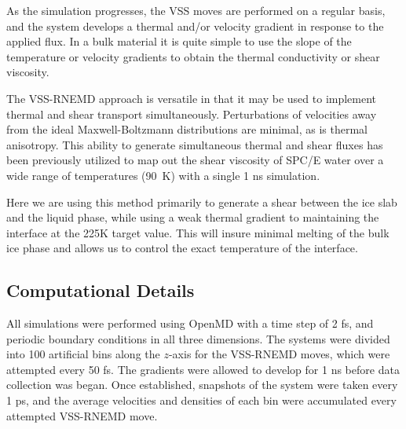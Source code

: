 \documentclass[journal = jpccck, manuscript = article]{achemso}
\begin{document}
As the simulation progresses, the VSS moves are performed on a regular
basis, and the system develops a thermal and/or velocity gradient in
response to the applied flux.  In a bulk material it is quite simple
to use the slope of the temperature or velocity gradients to obtain
the thermal conductivity or shear viscosity.

The VSS-RNEMD approach is versatile in that it may be used to
implement thermal and shear transport simultaneously.  Perturbations
of velocities away from the ideal Maxwell-Boltzmann distributions are
minimal, as is thermal anisotropy.  This ability to generate
simultaneous thermal and shear fluxes has been previously utilized to
map out the shear viscosity of SPC/E water over a wide range of
temperatures (90~K) with a single 1 ns simulation.\cite{Kuang12}

Here we are using this method primarily to generate a shear between
the ice slab and the liquid phase, while using a weak thermal gradient
to maintaining the interface at the 225K target value.  This will
insure minimal melting of the bulk ice phase and allows us to control
the exact temperature of the interface.

\subsection{Computational Details}
All simulations were performed using OpenMD with a time step of 2 fs,
and periodic boundary conditions in all three dimensions. The systems
were divided into 100 artificial bins along the $z$-axis for the
VSS-RNEMD moves, which were attempted every 50 fs. The gradients were
allowed to develop for 1 ns before data collection was began. Once
established, snapshots of the system were taken every 1 ps, and the
average velocities and densities of each bin were accumulated every
attempted VSS-RNEMD move.

\end{document}
